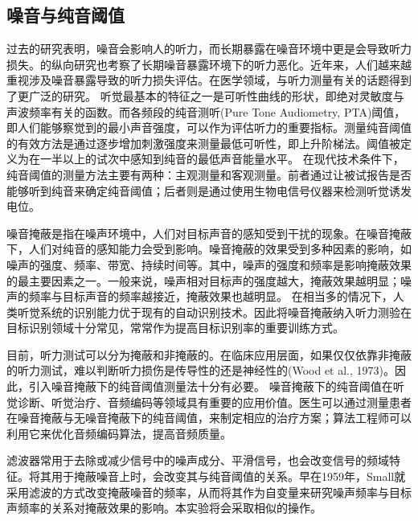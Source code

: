 \documentclass[jou,12pt,floatsintext]{apa7} %
\begin{document}
\subsection{\heiti 噪音与纯音阈值}
\vspace{-1em}
过去的研究表明，噪音会影响人的听力，而长期暴露在噪音环境中更是会导致听力损失\parencite{corso1959age}。\textcite{lapsley2004longitudinal}的纵向研究也考察了长期噪音暴露环境下的听力恶化。近年来，人们越来越重视涉及噪音暴露导致的听力损失评估。在医学领域，与听力测量有关的话题得到了更广泛的研究\parencite{gorga2006using,熊彬彬2023纯音听阈值正常的中青年耳鸣群体耳蜗功能分析,周娜2017听力正常成人短音}。
听觉最基本的特征之一是可听性曲线的形状，即绝对灵敏度与声波频率有关的函数\parencite{olsho1988pure}。而各频段的纯音测听(Pure Tone Audiometry, PTA)阈值，即人们能够察觉到的最小声音强度，可以作为评估听力的重要指标\parencite{杨小萍2008不同听力水平听性稳态反应阈值与纯音测听阈值比较}。测量纯音阈值的有效方法是通过逐步增加刺激强度来测量最低可听性，即上升阶梯法\parencite{carhart1959preferred}。阈值被定义为在一半以上的试次中感知到纯音的最低声音能量水平。
在现代技术条件下，纯音阈值的测量方法主要有两种：主观测量和客观测量。前者通过让被试报告是否能够听到纯音来确定纯音阈值；后者则是通过使用生物电信号仪器来检测听觉诱发电位\parencite{aoyagi1994pure}。

噪音掩蔽是指在噪声环境中，人们对目标声音的感知受到干扰的现象。在噪音掩蔽下，人们对纯音的感知能力会受到影响。噪音掩蔽的效果受到多种因素的影响，如噪声的强度、频率、带宽、持续时间等。其中，噪声的强度和频率是影响掩蔽效果的最主要因素之一。一般来说，噪声相对目标声的强度越大，掩蔽效果越明显；噪声的频率与目标声音的频率越接近，掩蔽效果也越明显\parencite{small1959pure}。
在相当多的情况下，人类听觉系统的识别能力优于现有的自动识别技术。因此将噪音掩蔽纳入听力测验在目标识别领域十分常见，常常作为提高目标识别率的重要训练方式\parencite{李薇2014噪声中纯音听辨能力的训练效应}。

目前，听力测试可以分为掩蔽和非掩蔽的。在临床应用层面，如果仅仅依靠非掩蔽的听力测试，难以判断听力损伤是传导性的还是神经性的(Wood et al., 1973)。因此，引入噪音掩蔽下的纯音阈值测量法十分有必要。
噪音掩蔽下的纯音阈值在听觉诊断、听觉治疗、音频编码等领域具有重要的应用价值。医生可以通过测量患者在噪音掩蔽与无噪音掩蔽下的纯音阈值，来制定相应的治疗方案；算法工程师可以利用它来优化音频编码算法，提高音频质量。

滤波器常用于去除或减少信号中的噪声成分、平滑信号，也会改变信号的频域特征。将其用于掩蔽噪音上时，会改变其与纯音阈值的关系。早在1959年，Small就采用滤波的方式改变掩蔽噪音的频率，从而将其作为自变量来研究噪声频率与目标声频率的关系对掩蔽效果的影响\parencite{small1959pure}。本实验将会采取相似的操作。
\end{document}
